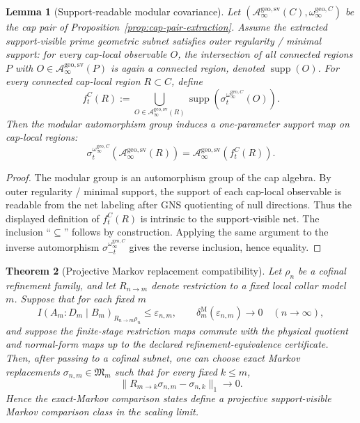 \documentclass[11pt]{article}
\newtheorem{theorem}{Theorem}[section]
\newtheorem{lemma}[theorem]{Lemma}
\begin{document}
\begin{lemma}[Support-readable modular covariance]\label{lem:support-readable-modular-covariance}
Let \((\mathcal A_\infty^{\mathrm{geo,sv}}(C),\omega_\infty^{\mathrm{geo},C})\) be the cap pair
of Proposition~\ref{prop:cap-pair-extraction}. Assume the extracted support-visible prime
geometric subnet satisfies outer regularity / minimal support: for every cap-local observable
\(O\), the intersection of all connected regions \(P\) with
\(O\in\mathcal A_\infty^{\mathrm{geo,sv}}(P)\) is again a connected region, denoted
\(\operatorname{supp}(O)\). For every connected cap-local region \(R\subset C\), define
\[
f_t^C(R)
:=
\bigcup_{O\in\mathcal A_\infty^{\mathrm{geo,sv}}(R)}
\operatorname{supp}\!\left(\sigma_t^{\omega_\infty^{\mathrm{geo},C}}(O)\right).
\]
Then the modular automorphism group induces a one-parameter support map on cap-local regions:
\[
\sigma_t^{\omega_\infty^{\mathrm{geo},C}}
\!\left(\mathcal A_\infty^{\mathrm{geo,sv}}(R)\right)
=
\mathcal A_\infty^{\mathrm{geo,sv}}\!\left(f_t^C(R)\right).
\]
\end{lemma}

\begin{proof}
The modular group is an automorphism group of the cap algebra. By outer regularity / minimal
support, the support of each cap-local observable is readable from the net labeling after GNS
quotienting of null directions. Thus the displayed definition of \(f_t^C(R)\) is intrinsic to the
support-visible net. The inclusion ``\(\subseteq\)'' follows by construction. Applying the same
argument to the inverse automorphism \(\sigma_{-t}^{\omega_\infty^{\mathrm{geo},C}}\) gives the
reverse inclusion, hence equality.
\end{proof}

\begin{theorem}[Projective Markov replacement compatibility]\label{thm:projective-markov-replacement}
Let \(\rho_n\) be a cofinal refinement family, and let \(R_{n\to m}\) denote
restriction to a fixed local collar model \(m\). Suppose that for each fixed
\(m\)
\[
I(A_m:D_m\mid B_m)_{R_{n\to m}\rho_n}\le \varepsilon_{n,m},
\qquad
\delta^{\mathrm M}_{m}(\varepsilon_{n,m})\to0
\quad(n\to\infty),
\]
and suppose the finite-stage restriction maps commute with the physical
quotient and normal-form maps up to the declared refinement-equivalence
certificate. Then, after passing to a cofinal subnet, one can choose exact
Markov replacements \(\sigma_{n,m}\in\mathfrak M_m\) such that for every fixed
\(k\le m\),
\[
\|R_{m\to k}\sigma_{n,m}-\sigma_{n,k}\|_1\to0.
\]
Hence the exact-Markov comparison states define a projective support-visible
Markov comparison class in the scaling limit.
\end{theorem}
\end{document}
